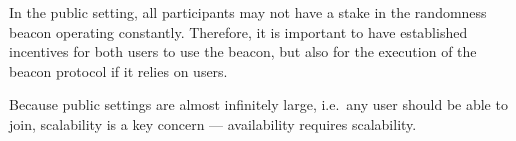 In the public setting, all participants may not have a stake in the randomness beacon operating constantly.
Therefore, it is important to have established incentives for both users to use the beacon, but also for the execution of the beacon protocol if it relies on users.

Because public settings are almost infinitely large, i.e.\ any user should be able to join, scalability is a key concern --- availability requires scalability.


